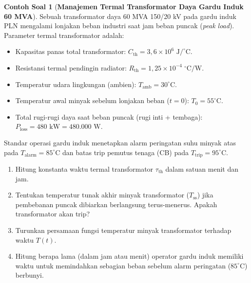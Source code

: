 \documentclass[11pt,a4paper]{article}
\theoremstyle{definition}
\newtheorem{example}{Contoh Soal}[section]
\begin{document}
\begin{example}[\textbf{Manajemen Termal Transformator Daya Gardu Induk 60 MVA}]
Sebuah transformator daya 60 MVA 150/20 kV pada gardu induk PLN mengalami lonjakan beban industri saat jam beban puncak (\textit{peak load}). Parameter termal transformator adalah:
\begin{itemize}[leftmargin=*]
    \item Kapasitas panas total transformator: $C_{\text{th}} = 3{,}6 \times 10^6\text{ J}/^\circ\text{C}$.
    \item Resistansi termal pendingin radiator: $R_{\text{th}} = 1{,}25 \times 10^{-4}\;^\circ\text{C}/\text{W}$.
    \item Temperatur udara lingkungan (ambien): $T_{\text{amb}} = 30^\circ\text{C}$.
    \item Temperatur awal minyak sebelum lonjakan beban ($t=0$): $T_0 = 55^\circ\text{C}$.
    \item Total rugi-rugi daya saat beban puncak (rugi inti + tembaga): $P_{\text{loss}} = 480\text{ kW} = 480.000\text{ W}$.
\end{itemize}
Standar operasi gardu induk menetapkan alarm peringatan suhu minyak atas pada $T_{\text{alarm}} = 85^\circ\text{C}$ dan batas trip pemutus tenaga (CB) pada $T_{\text{trip}} = 95^\circ\text{C}$.
\begin{enumerate}[label=(\alph*)]
    \item Hitung konstanta waktu termal transformator $\tau_{\text{th}}$ dalam satuan menit dan jam.
    \item Tentukan temperatur tunak akhir minyak transformator ($T_{\text{ss}}$) jika pembebanan puncak dibiarkan berlangsung terus-menerus. Apakah transformator akan trip?
    \item Turunkan persamaan fungsi temperatur minyak transformator terhadap waktu $T(t)$.
    \item Hitung berapa lama (dalam jam atau menit) operator gardu induk memiliki waktu untuk memindahkan sebagian beban sebelum alarm peringatan ($85^\circ\text{C}$) berbunyi.
\end{enumerate}


\end{example}
\end{document}
